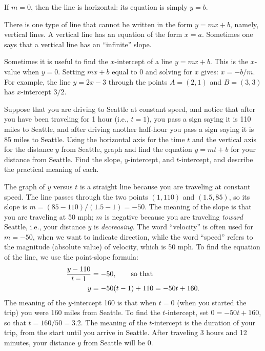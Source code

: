 If $m=0$, then the line is horizontal: its equation is simply $y=b$.


There is one type of line that cannot be written in the form $y=mx+b$,
namely, vertical lines.  A vertical line has an equation of the form $x=a$.
Sometimes one says that a vertical line has an ``infinite'' slope.


Sometimes it is useful to find the $x$-intercept of a line $y=mx+b$.  This is
the $x$-value when $y=0$.  Setting $mx+b$ equal to 0 and solving for
$x$ gives: $x=-b/m$.  For example, the line $y=2x-3$ through the points
$A=(2,1)$ and $B=(3,3)$ has $x$-intercept $3/2$.


\begin{example} Suppose that you are driving to Seattle at constant speed, and
notice that after you have been traveling for 1 hour (i.e., $t=1$),
you pass a sign saying it is 110 miles to Seattle, and after driving
another half-hour you pass a sign saying it is 85 miles to Seattle.  Using
the horizontal axis for the time $t$ and the vertical axis for the
distance $y$ from Seattle, graph and find the equation $y=mt+b$ for
your distance from Seattle.  Find the slope, $y$-intercept, and
$t$-intercept, and describe the practical meaning of each.

The graph of $y$ versus $t$ is a straight line because you are traveling
at constant speed.  The line passes through the two points $(1,110)$ and
$(1.5,85)$, so its slope is $m=(85-110)/(1.5-1)=-50$.  The meaning of the
slope is that you are traveling at 50 mph; $m$ is negative because you are
traveling {\it toward\/} Seattle, i.e., your distance $y$ is {\it
decreasing}.  The word ``velocity'' is often used for $m=-50$, when we want
to indicate direction, while the word ``speed'' refers to the magnitude
(absolute value) of velocity, which is 50 mph.  To find the equation of the
line, we use the point-slope formula:
\begin{align*}
    {y-110\over t-1}&=-50,\qquad\hbox{so~that} \\
    y&=-50(t-1)+110=-50t+160.
\end{align*}
The meaning of the $y$-intercept 160 is that when $t=0$ (when you
started the trip) you were 160 miles from Seattle.  To find the
$t$-intercept, set $0=-50t+160$, so that $t=160/50=3.2$.  The meaning
of the $t$-intercept is the duration of your trip, from the start
until you arrive in Seattle.
After traveling 3 hours and 12 minutes, your distance $y$ from Seattle will be
0.  
\label{example:drive to Seattle}
\end{example} 


